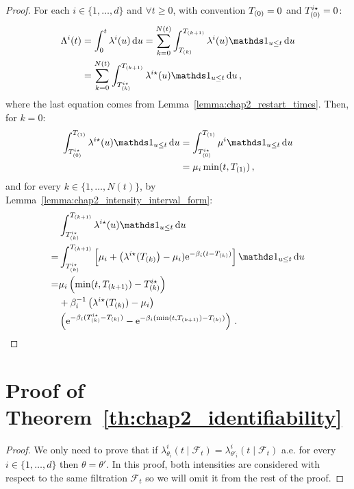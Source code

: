 \begin{subappendices}
      \begin{proof}
        For each $i\in\{1,\ldots, d\}$ and \(\forall t\geq 0\), with convention \(T\park[0] = 0\) and \(T\park[0]^{i\star} = 0\):
        \begin{align*}
          \Lambda^i(t)
          &= \int_{0}^{t}{\lambda^i(u)\,\mathrm{d}u}
          = \sum_{k=0}^{N(t)} \int_{T\park}^{T\park[k+1]}{\lambda^i(u) \II_{u \le t} \,\mathrm{d}u}\\
          &= \sum_{k=0}^{N(t)} \int_{T\park^{i\star}}^{T\park[k+1]} \lambda^{i\star}(u) \II_{u \le t} \, \mathrm{d}u \,,
        \end{align*}
        where the last equation comes from Lemma~\ref{lemma:chap2_restart_times}.
        Then, for \(k=0\):
        \begin{align*}
          \int_{T\park[0]^{i\star}}^{T\park[1]} \lambda^{i\star}(u) \II_{u \le t} \, \mathrm{d}u
          &= \int_{T\park[0]^{i\star}}^{T\park[1]} \mu^i \II_{u \le t} \, \mathrm{d}u\\
          &= \mu_i \min(t, T\park[1]) \,,
        \end{align*}
        and for every \(k \in \{1, \dots, N(t)\}\), by Lemma~\ref{lemma:chap2_intensity_interval_form}:
        \begin{align*}
          &\int_{T\park^{i\star}}^{T\park[k+1]} \lambda^{i\star}(u) \II_{u \le t} \, \mathrm{d}u \\
          = &\int_{T\park^{i\star}}^{T\park[k+1]} \left[ \mu_i + \left(\lambda^{i\star}(T\park\right) - \mu_i)\mathrm{e}^{-\beta_i(t-T\park)} \right] \II_{u \le t} \, \mathrm{d}u \\
          = &\mu_i \left(\min(t, T\park[k+1]) - T\park^{i\star}\right)\\ &+ \beta_i^{-1} \left(\lambda^{i\star}(T\park) - \mu_i \right) \\
          &\left(\mathrm{e}^{-\beta_i(T\park^{i\star} - T\park)} - \mathrm{e}^{-\beta_i(\min(t, T\park[k+1])- T\park)} \right)\,.
        \end{align*}
      \end{proof}
  
  \section{Proof of Theorem~\ref{th:chap2_identifiability}}\label{app:chap2_proof}
  
  \begin{proof}
      We only need to prove that if $\lambda_{\theta_i}^i(t \mid \mathcal{F}_t) = \lambda_{\theta'_i}^i(t \mid \mathcal{F}_t)$ a.e. for every $i\in\{1, \ldots, d\}$ then $\theta = \theta'$. In this proof, both intensities are considered with respect to the same filtration $\mathcal{F}_t$ so we will omit it from the rest of the proof.
      

\end{proof}
\end{subappendices}
